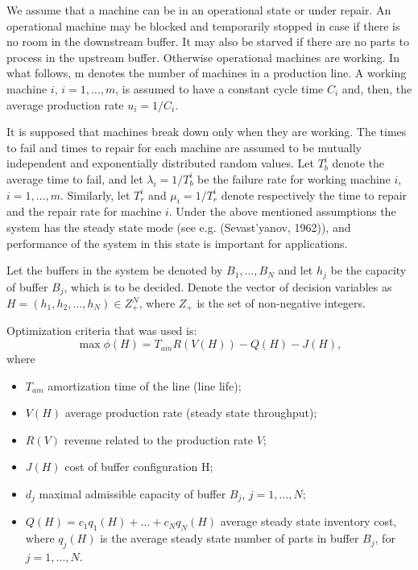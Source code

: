 \documentclass{ifacconf}
\begin{document}
We assume that a machine can be in an operational state or under 
repair. An operational machine may be blocked and temporarily stopped in case if there 
is  no  room  in  the  downstream  buffer.  It  may  also  be  starved  if  there  are  no  parts  to 
process  in  the  upstream  buffer. Otherwise operational machines are working. In what 
follows, m denotes the number of machines in a production line. A working machine $i$, 
$i=1,…,m$, is assumed to have a constant cycle time $C_i$ and, then, the average production 
rate $u_i=1/C_i$. 

It is supposed that machines break down only when they are working. The times to fail 
and  times  to  repair  for  each  machine  are  assumed  to  be  mutually  independent  and 
exponentially distributed random values. Let $T_b^i$ denote the average time to fail, and let 
$\lambda_i=1/T_b^i$ be the failure rate for working machine $i$, $i=1,…,m$. Similarly, let $T_r^i$ and $\mu_i=1/T_r^i$  
denote  respectively  the  time  to  repair  and  the repair rate for machine $i$. Under the 
above  mentioned  assumptions  the  system  has  the  steady  state  mode  (see  e.g. 
(Sevast'yanov,  1962)),  and  performance  of  the  system  in  this  state  is  important  for 
applications.

Let the buffers in the system be denoted by $B_1,…,B_N$ and let $h_j$ be the capacity of buffer 
$B_j$,  which  is  to  be  decided.  Denote  the  vector  of  decision  variables  as  $H=  (h_1,  h_2,…, h_N )\in  Z_+^N$,  where  $Z_+$  is  the  set  of  non-negative  integers.  

Optimization criteria that was used is:
\begin{equation}
\label{criteria}
\max \phi(H)=T_{am} R(V(H)) - Q(H) - J(H),
\end{equation}
where 
\begin{itemize}
\item $T_{am}$  amortization time of the line (line life); 
\item $V(H)$  average production rate (steady state throughput); 
\item $R(V)$  revenue related to the production rate $V$; 
\item $J(H)$ cost of buffer configuration H; 
\item $d_j$ maximal admissible capacity of buffer $B_j$, $j=1,…,N$;
\item $Q(H)= c_1q_1(H)+ …+c_N q_N(H)$ average steady state inventory cost, where $q_j(H)$ is the average steady state number of parts in buffer $B_j$, for $j=1,…,N$.
\end{itemize}
\end{document}
